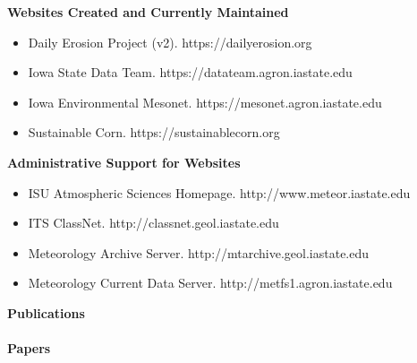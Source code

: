 %
\Large \bf Websites Created and Currently Maintained
\normalsize \sf
\begin{itemize}
\item Daily Erosion Project (v2). https://dailyerosion.org
\item Iowa State Data Team. https://datateam.agron.iastate.edu
\item Iowa Environmental Mesonet. https://mesonet.agron.iastate.edu
\item Sustainable Corn. https://sustainablecorn.org
\end{itemize}
\Large \bf Administrative Support for Websites
\normalsize \sf
\begin{itemize}
\item ISU Atmospheric Sciences Homepage. http://www.meteor.iastate.edu
\item ITS ClassNet. http://classnet.geol.iastate.edu
\item Meteorology Archive Server. http://mtarchive.geol.iastate.edu
\item Meteorology Current Data Server. http://metfs1.agron.iastate.edu
\end{itemize}
%
\Large \bf Publications\\ \\
\normalsize \bf Papers
\normalsize \sf
